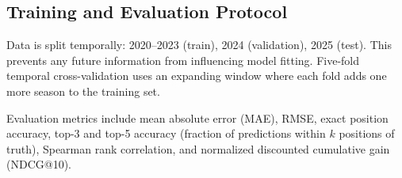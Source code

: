 \subsection{Training and Evaluation Protocol}

Data is split temporally: 2020--2023 (train), 2024 (validation), 2025 (test).
This prevents any future information from influencing model fitting. Five-fold
temporal cross-validation uses an expanding window where each fold adds one
more season to the training set.

Evaluation metrics include mean absolute error (MAE), RMSE, exact position
accuracy, top-3 and top-5 accuracy (fraction of predictions within $k$ positions
of truth), Spearman rank correlation, and normalized discounted cumulative gain
(NDCG@10).
